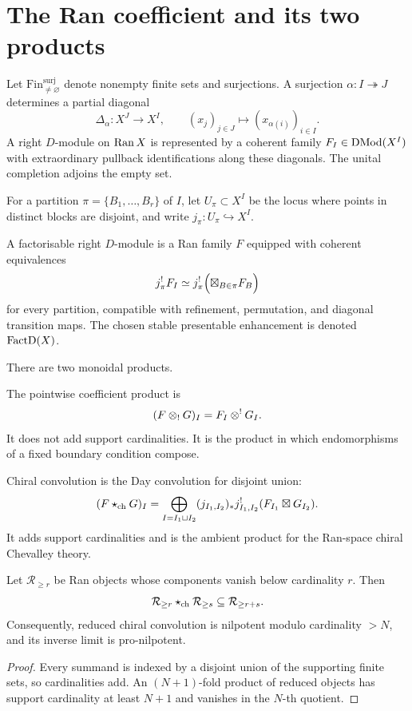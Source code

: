 \section{The Ran coefficient and its two products}
Let \(\mathrm{Fin}^{\mathrm{surj}}_{\ne\varnothing}\) denote nonempty finite sets and surjections.  A surjection \(\alpha:I\twoheadrightarrow J\) determines a partial diagonal
\[
 \Delta_\alpha:X^J\longrightarrow X^I,
 \qquad (x_j)_{j\in J}\longmapsto (x_{\alpha(i)})_{i\in I}.
\]
A right \(D\)-module on \(\operatorname{Ran} X\) is represented by a coherent family \(F_I\in\operatorname{DMod}(X^I)\) with extraordinary pullback identifications along these diagonals.  The unital completion adjoins the empty set.

For a partition \(\pi=\{B_1,\dots,B_r\}\) of \(I\), let \(U_\pi\subset X^I\) be the locus where points in distinct blocks are disjoint, and write \(j_\pi:U_\pi\hookrightarrow X^I\).

\begin{definition}
A factorisable right \(D\)-module is a Ran family \(F\) equipped with coherent equivalences
\[
 j_\pi^!F_I\simeq j_\pi^!\Bigl(\boxtimes_{B\in\pi}F_B\Bigr)
\]
for every partition, compatible with refinement, permutation, and diagonal transition maps.  The chosen stable presentable enhancement is denoted \(\operatorname{FactD}(X)\).
\end{definition}

There are two monoidal products.

The pointwise coefficient product is
\[
 (F\mathbin{\otimes_{!}} G)_I=F_I\otimes^!G_I.
\]
It does not add support cardinalities.  It is the product in which endomorphisms of a fixed boundary condition compose.

Chiral convolution is the Day convolution for disjoint union:
\[
 (F\mathbin{\star_{\mathrm{ch}}} G)_I=\bigoplus_{I=I_1\sqcup I_2}
 (j_{I_1,I_2})_*j_{I_1,I_2}^!(F_{I_1}\boxtimes G_{I_2}).
\]
It adds support cardinalities and is the ambient product for the Ran-space chiral Chevalley theory.

\begin{proposition}\label{prop:cardinality}
Let \(\mathcal R_{\ge r}\) be Ran objects whose components vanish below cardinality \(r\).  Then
\[
 \mathcal R_{\ge r}\mathbin{\star_{\mathrm{ch}}}\mathcal R_{\ge s}\subseteq\mathcal R_{\ge r+s}.
\]
Consequently, reduced chiral convolution is nilpotent modulo cardinality \(>N\), and its inverse limit is pro-nilpotent.
\end{proposition}
\begin{proof}
Every summand is indexed by a disjoint union of the supporting finite sets, so cardinalities add.  An \((N+1)\)-fold product of reduced objects has support cardinality at least \(N+1\) and vanishes in the \(N\)-th quotient.
\end{proof}

